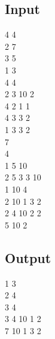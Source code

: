 \documentclass[20pt]{article}
\begin{document}
\subsection{Input}
\hspace{10mm} 4 4\\
\-\hspace{10mm} 2 7\\
\-\hspace{10mm} 3 5\\
\-\hspace{10mm} 1 3\\
\-\hspace{10mm} 4 4\\
\-\hspace{10mm} 2 3 10 2\\
\-\hspace{10mm} 4 2 1 1\\
\-\hspace{10mm} 4 3 3 2\\
\-\hspace{10mm} 1 3 3 2\\
\-\hspace{10mm} 7\\
\-\hspace{10mm} 4\\
\-\hspace{10mm} 1 5 10\\
\-\hspace{10mm} 2 5 3 3 10\\
\-\hspace{10mm} 1 10 4\\
\-\hspace{10mm} 2 10 1 3 2\\
\-\hspace{10mm} 2 4 10 2 2\\
\-\hspace{10mm} 5 10 2\\

\subsection{Output}
\-\hspace{10mm} 1 3\\
\-\hspace{10mm} 2 4\\
\-\hspace{10mm} 3 4\\
\-\hspace{10mm} 3 4 10 1 2\\
\-\hspace{10mm} 7 10 1 3 2\\
\end{document}

